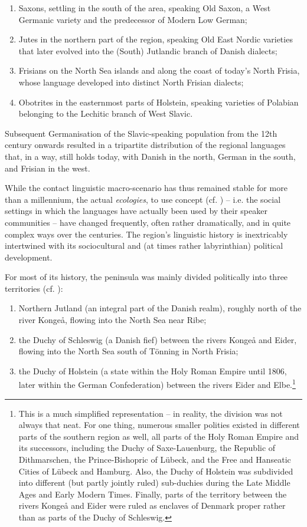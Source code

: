 \documentclass[output=paper]{langsci/langscibook}
\begin{document}
\begin{enumerate}
	\item Saxons, settling in the south of the area, speaking Old Saxon, a West Germanic variety and the predecessor of Modern Low German;
	\item Jutes in the northern part of the region, speaking Old East Nordic varieties that later evolved into the (South) Jutlandic branch of Danish dialects;
	\item Frisians on the North Sea islands and along the coast of today’s North Frisia, whose language developed into distinct North Frisian dialects;
	\item Obotrites in the easternmost parts of Holstein, speaking varieties of Polabian belonging to the Lechitic branch of West Slavic.
\end{enumerate}

Subsequent Germanisation of the Slavic-speaking population from the 12th century onwards resulted in a tripartite distribution of the regional languages that, in a way, still holds today, with Danish in the north, German in the south, and Frisian in the west.

While the contact linguistic macro-scenario has thus remained stable for more than a millennium, the actual \textit{ecologies}, to use  concept (cf. \citealt{Eliasson.2013}) – i.e. the social settings in which the languages have actually been used by their speaker communities – have changed frequently, often rather dramatically, and in quite complex ways over the centuries. The region’s linguistic history is inextricably intertwined with its sociocultural and (at times rather labyrinthian) political development.

For most of its history, the peninsula was mainly divided politically into three territories (cf. ):


\begin{enumerate}
\item Northern Jutland (an integral part of the Danish realm), roughly north of the river Kongeå, flowing into the North Sea near Ribe;
\item the Duchy of Schleswig (a Danish fief) between the rivers Kongeå and Eider, flowing into the North Sea south of Tönning in North Frisia;
\item the Duchy of Holstein (a state within the Holy Roman Empire until 1806, later within the German Confederation) between the rivers Eider and Elbe.\footnote{This is a much simplified representation – in reality, the division was not always that neat. For one thing, numerous smaller polities existed in different parts of the southern region as well, all parts of the Holy Roman Empire and its successors, including the Duchy of Saxe-Lauenburg, the Republic of Dithmarschen, the Prince-Bishopric of Lübeck, and the Free and Hanseatic Cities of Lübeck and Hamburg. Also, the Duchy of Holstein was subdivided into different (but partly jointly ruled) sub-duchies during the Late Middle Ages and Early Modern Times. Finally, parts of the territory between the rivers Kongeå and Eider were ruled as enclaves of Denmark proper rather than as parts of the Duchy of Schleswig.}
\end{enumerate}
\end{document}
